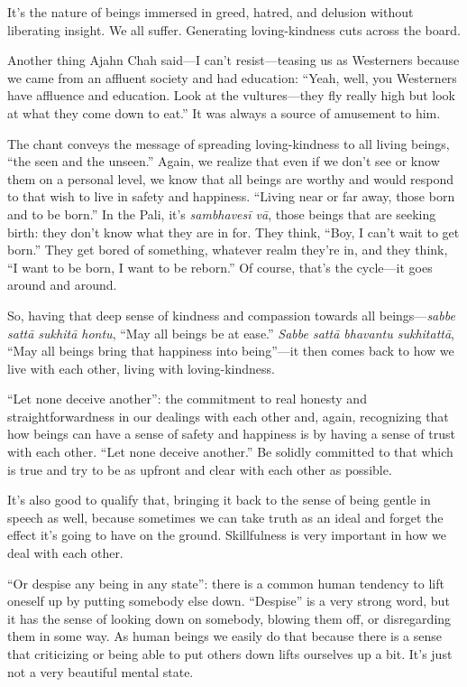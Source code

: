 It’s the nature of beings immersed in greed, hatred, and delusion
without liberating insight. We all suffer. Generating loving-kindness
cuts across the board.

Another thing Ajahn Chah said—I can’t resist—teasing us as Westerners
because we came from an affluent society and had education: “Yeah, well,
you Westerners have affluence and education. Look at the vultures—they
fly really high but look at what they come down to eat.” It was always a
source of amusement to him.

The chant conveys the message of spreading loving-kindness to all living
beings, “the seen and the unseen.” Again, we realize that even if we
don’t see or know them on a personal level, we know that all beings are
worthy and would respond to that wish to live in safety and happiness.
“Living near or far away, those born and to be born.” In the Pali, it’s
\emph{sambhavesī vā}, those beings that are seeking birth: they don’t
know what they are in for. They think, “Boy, I can’t wait to get born.”
They get bored of something, whatever realm they’re in, and they think,
“I want to be born, I want to be reborn.” Of course, that’s the cycle—it
goes around and around.

So, having that deep sense of kindness and compassion towards all
beings—\emph{sabbe sattā sukhitā hontu}, “May all beings be at ease.”
\emph{Sabbe sattā bhavantu sukhitattā}, “May all beings bring that
happiness into being”—it then comes back to how we live with each other,
living with loving-kindness.

“Let none deceive another”: the commitment to real honesty and
straightforwardness in our dealings with each other and, again,
recognizing that how beings can have a sense of safety and happiness is
by having a sense of trust with each other. “Let none deceive another.”
Be solidly committed to that which is true and try to be as upfront and
clear with each other as possible.

It’s also good to qualify that, bringing it back to the sense of being
gentle in speech as well, because sometimes we can take truth as an
ideal and forget the effect it’s going to have on the ground.
Skillfulness is very important in how we deal with each other.

“Or despise any being in any state”: there is a common human tendency to
lift oneself up by putting somebody else down. “Despise” is a very
strong word, but it has the sense of looking down on somebody, blowing
them off, or disregarding them in some way. As human beings we easily do
that because there is a sense that criticizing or being able to put
others down lifts ourselves up a bit. It’s just not a very beautiful
mental state.

